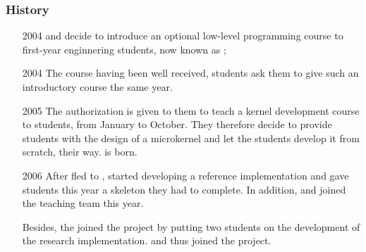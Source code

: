 \begin{frame}
  \frametitle{History}

  \begin{itemize}
    \item[2004]
       and  decide
      to introduce an optional low-level programming course to first-year
      enginnering students, now known as ;
    \item[2004]
      The course having been well received,  students ask them to give such an introductory course the
      same year.
    \item[2005]
      The authorization is given to them to teach a kernel development course
      to  students, from January to October. They therefore decide
      to provide students with the design of a microkernel and let the students
      develop it from scratch, their way.  is born.
    \item[2006]
      After  fled to ,  started developing a reference implementation and gave
      students this year a skeleton they had to complete. In addition,
       and  joined the teaching
      team this year.

      \-

      Besides, the  joined the project
      by putting two students on the development of the 
      research implementation.  and  thus joined the project.
  \end{itemize}
\end{frame}


